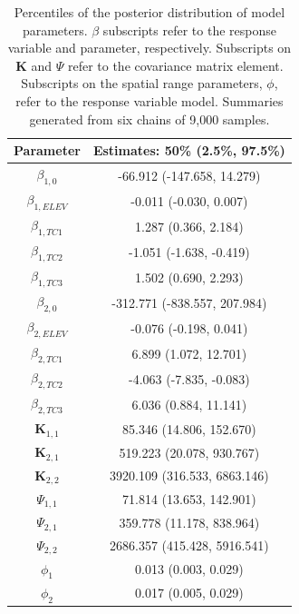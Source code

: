 \documentclass[a4paper]{article}
\newcommand{\bK}{\textbf{K}}
\begin{document}
\begin{table}[h!]
\begin{center}
\caption{Percentiles of the posterior distribution of model parameters.  $\beta$ subscripts refer to the response variable and parameter, respectively.  Subscripts on $\bK$ and $\Psi$ refer to the covariance matrix element.  Subscripts on the spatial range parameters, $\phi$, refer to the response variable model. Summaries generated from six chains of 9,000 samples.} \label{RealEsts}
\begin{tabular}
[c]{|c|c|}%
\hline Parameter & Estimates: 50\% (2.5\%, 97.5\%)\\\hline
$\beta_{1,0}$ &  -66.912 (-147.658, 14.279)\\
$\beta_{1,ELEV}$ & -0.011 (-0.030, 0.007) \\
$\beta_{1,TC1}$ &  1.287 (0.366, 2.184)\\
$\beta_{1,TC2}$ &  -1.051 (-1.638, -0.419)\\
$\beta_{1,TC3}$ &  1.502 (0.690, 2.293)\\
$\beta_{2,0}$ &  -312.771 (-838.557, 207.984)\\
$\beta_{2,ELEV}$ &  -0.076 (-0.198, 0.041)\\
$\beta_{2,TC1}$ &  6.899 (1.072, 12.701)\\
$\beta_{2,TC2}$ &  -4.063 (-7.835, -0.083)\\
$\beta_{2,TC3}$ &  6.036 (0.884, 11.141)\\
\hline
$\bK_{1,1}$ &  85.346 (14.806, 152.670)\\
$\bK_{2,1}$ & 519.223 (20.078, 930.767)\\
$\bK_{2,2}$ &  3920.109 (316.533, 6863.146)\\
\hline
$\Psi_{1,1}$ & 71.814 (13.653, 142.901)\\
$\Psi_{2,1}$ & 359.778 (11.178, 838.964)\\
$\Psi_{2,2}$ & 2686.357 (415.428, 5916.541)\\
\hline
$\phi_{1}$ & 0.013 (0.003, 0.029)\\
$\phi_{2}$ & 0.017 (0.005, 0.029)\\
\hline
\end{tabular}

\end{center}
\end{table}
\end{document}
